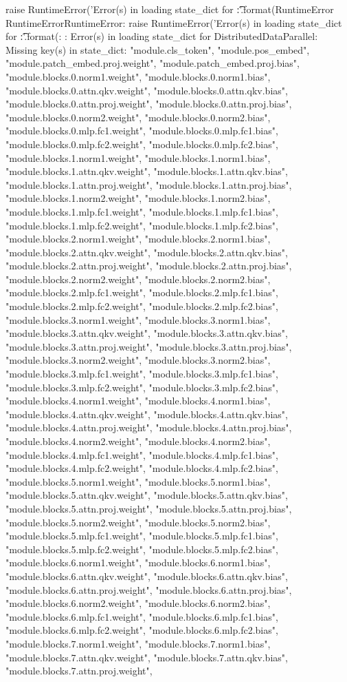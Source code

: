     raise RuntimeError('Error(s) in loading state_dict for {}:\n\t{}'.format(RuntimeError    
RuntimeErrorRuntimeError: raise RuntimeError('Error(s) in loading state_dict for {}:\n\t{}'.format(: : Error(s) in loading state_dict for DistributedDataParallel:
	Missing key(s) in state_dict: "module.cls_token", "module.pos_embed", "module.patch_embed.proj.weight", "module.patch_embed.proj.bias", "module.blocks.0.norm1.weight", "module.blocks.0.norm1.bias", "module.blocks.0.attn.qkv.weight", "module.blocks.0.attn.qkv.bias", "module.blocks.0.attn.proj.weight", "module.blocks.0.attn.proj.bias", "module.blocks.0.norm2.weight", "module.blocks.0.norm2.bias", "module.blocks.0.mlp.fc1.weight", "module.blocks.0.mlp.fc1.bias", "module.blocks.0.mlp.fc2.weight", "module.blocks.0.mlp.fc2.bias", "module.blocks.1.norm1.weight", "module.blocks.1.norm1.bias", "module.blocks.1.attn.qkv.weight", "module.blocks.1.attn.qkv.bias", "module.blocks.1.attn.proj.weight", "module.blocks.1.attn.proj.bias", "module.blocks.1.norm2.weight", "module.blocks.1.norm2.bias", "module.blocks.1.mlp.fc1.weight", "module.blocks.1.mlp.fc1.bias", "module.blocks.1.mlp.fc2.weight", "module.blocks.1.mlp.fc2.bias", "module.blocks.2.norm1.weight", "module.blocks.2.norm1.bias", "module.blocks.2.attn.qkv.weight", "module.blocks.2.attn.qkv.bias", "module.blocks.2.attn.proj.weight", "module.blocks.2.attn.proj.bias", "module.blocks.2.norm2.weight", "module.blocks.2.norm2.bias", "module.blocks.2.mlp.fc1.weight", "module.blocks.2.mlp.fc1.bias", "module.blocks.2.mlp.fc2.weight", "module.blocks.2.mlp.fc2.bias", "module.blocks.3.norm1.weight", "module.blocks.3.norm1.bias", "module.blocks.3.attn.qkv.weight", "module.blocks.3.attn.qkv.bias", "module.blocks.3.attn.proj.weight", "module.blocks.3.attn.proj.bias", "module.blocks.3.norm2.weight", "module.blocks.3.norm2.bias", "module.blocks.3.mlp.fc1.weight", "module.blocks.3.mlp.fc1.bias", "module.blocks.3.mlp.fc2.weight", "module.blocks.3.mlp.fc2.bias", "module.blocks.4.norm1.weight", "module.blocks.4.norm1.bias", "module.blocks.4.attn.qkv.weight", "module.blocks.4.attn.qkv.bias", "module.blocks.4.attn.proj.weight", "module.blocks.4.attn.proj.bias", "module.blocks.4.norm2.weight", "module.blocks.4.norm2.bias", "module.blocks.4.mlp.fc1.weight", "module.blocks.4.mlp.fc1.bias", "module.blocks.4.mlp.fc2.weight", "module.blocks.4.mlp.fc2.bias", "module.blocks.5.norm1.weight", "module.blocks.5.norm1.bias", "module.blocks.5.attn.qkv.weight", "module.blocks.5.attn.qkv.bias", "module.blocks.5.attn.proj.weight", "module.blocks.5.attn.proj.bias", "module.blocks.5.norm2.weight", "module.blocks.5.norm2.bias", "module.blocks.5.mlp.fc1.weight", "module.blocks.5.mlp.fc1.bias", "module.blocks.5.mlp.fc2.weight", "module.blocks.5.mlp.fc2.bias", "module.blocks.6.norm1.weight", "module.blocks.6.norm1.bias", "module.blocks.6.attn.qkv.weight", "module.blocks.6.attn.qkv.bias", "module.blocks.6.attn.proj.weight", "module.blocks.6.attn.proj.bias", "module.blocks.6.norm2.weight", "module.blocks.6.norm2.bias", "module.blocks.6.mlp.fc1.weight", "module.blocks.6.mlp.fc1.bias", "module.blocks.6.mlp.fc2.weight", "module.blocks.6.mlp.fc2.bias", "module.blocks.7.norm1.weight", "module.blocks.7.norm1.bias", "module.blocks.7.attn.qkv.weight", "module.blocks.7.attn.qkv.bias", "module.blocks.7.attn.proj.weight", 